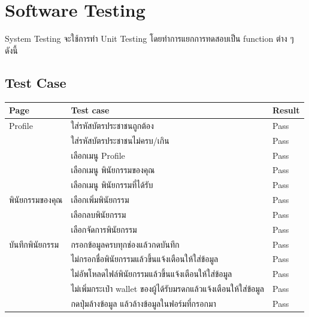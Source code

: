 \documentclass[12pt,oneside,openright,a4paper]{cpe-thai-project}
\begin{document}
\section{Software Testing}
\tab System Testing จะใช้การทำ Unit Testing โดยทำการแยกการทดสอบเป็น function ต่าง ๆ ดังนี้
\subsection {Test Case}
\begin{table}[h]
\begin{tabular}{|l|l|l|}
\hline
Page                   & Test case                                        &  Result \\ \hline
Profile                & ใส่รหัสบัตรประชาชนถูกต้อง                        &  Pass  \\ \hline
                       & ใส่รหัสบัตรประชาชนไม่ครบ/เกิน                    &   Pass     \\ \hline
                       & เลือกเมนู Profile                            &   Pass     \\ \hline
                       & เลือกเมนู พินัยกรรมของคุณ                     &    Pass    \\ \hline
                       & เลือกเมนู  พินัยกรรมที่ได้รับ                    &   Pass     \\ \hline
พินัยกรรมของคุณ        & เลือกเพิ่มพินัยกรรม                              &   Pass     \\ \hline
                       & เลือกลบพินัยกรรม                                 &     Pass   \\ \hline
                       & เลือกจัดการพินัยกรรม                           &  Pass      \\ \hline
บันทึกพินัยกรรม        & กรอกข้อมูลครบทุกช่องแล้วกดบันทึก                   &Pass        \\ \hline
                       & ไม่กรอกชื่อพินัยกรรมแล้วขึ้นแจ้งเตือนให้ใส่ข้อมูล                      & Pass       \\ \hline
                       & ไม่อัพโหลดไฟล์พินัยกรรมแล้วขึ้นแจ้งเตือนให้ใส่ข้อมูล                      &      Pass  \\ \hline
                       & ไม่เพิ่มกระเป๋า wallet ของผู้ได้รับมรดกแล้วแจ้งเตือนให้ใส่ข้อมูล        &Pass        \\ \hline             
                       & กดปุ่มล้างข้อมูล แล้วล้างข้อมูลในฟอร์มที่กรอกมา       &Pass        \\ \hline                    

\end{tabular}
\end{table}
\end{document}
